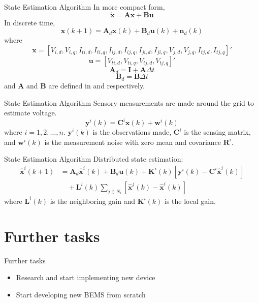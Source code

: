 \documentclass{beamer}
\begin{document}
\begin{frame}{State Estimation Algorithm}{}
In more compact form,
\[\dot{\boldsymbol{x}}=\boldsymbol{A}\boldsymbol{x}+\boldsymbol{B}\boldsymbol{u}\]
In discrete time,
\[\boldsymbol{x}(k+1)=\boldsymbol{A}_d \boldsymbol{x}(k)+\boldsymbol{B}_d \boldsymbol{u}(k) + \boldsymbol{n}_d(k)\]
where 
\[\boldsymbol{x}=[V_{i,d}, V_{i,q}, I_{ti,d}, I_{ti,q}, I_{ij,d}, I_{ij,q}, I_{ji,d}, I_{ji,q}, V_{j,d}, V_{j,q}, I_{tj,d}, I_{tj,q}]'\]
\[\boldsymbol{u}=[V_{ti,d}, V_{ti,q}, V_{tj,d}, V_{tj,q}]'\]
\[\boldsymbol{A}_d=\boldsymbol{I}+\boldsymbol{A}\Delta t \]
\[\boldsymbol{B}_d = \boldsymbol{B}\Delta t\]
and $\boldsymbol{A}$ and $\boldsymbol{B}$ are defined in \cite{rivers2014} and \cite{rana2018} respectively.
\end{frame}

\begin{frame}{State Estimation Algorithm}{}
Sensory measurements are made around the grid to estimate voltage.
\[\boldsymbol{y}^i(k)=\boldsymbol{C}^i \boldsymbol{x}(k) + \boldsymbol{w}^i(k)\]
where $i = 1,2,\ldots,n$. $\boldsymbol{y}^i(k)$ is the observations made, $\boldsymbol{C}^i$ is the sensing matrix, and $\boldsymbol{w}^i(k)$ is the measurement noise with zero mean and covariance $\boldsymbol{R}^i$.
\end{frame}

\begin{frame}{State Estimation Algorithm}{}
Distributed state estimation:
\begin{align*}
\hat{\boldsymbol{x}}^i(k+1) &= \boldsymbol{A}_d \hat{\boldsymbol{x}}^i(k)+\boldsymbol{B}_d \boldsymbol{u}(k)+\boldsymbol{K}^i(k)[\boldsymbol{y}^i(k)-\boldsymbol{C}^i \hat{\boldsymbol{x}}^i(k)]\\
&\quad + \boldsymbol{L}^i(k)\sum_{j\in N_i} [\hat{\boldsymbol{x}}^j(k)-\hat{\boldsymbol{x}}^i(k)]
\end{align*}
where $\boldsymbol{L}^i(k)$ is the neighboring gain and $\boldsymbol{K}^i(k)$ is the local gain.
\end{frame}

\section{Further tasks}
\begin{frame}{Further tasks}{}
\begin{itemize}
\item Research and start implementing new device
\item Start developing new BEMS from scratch
\end{itemize}
\end{frame}
\end{document}
